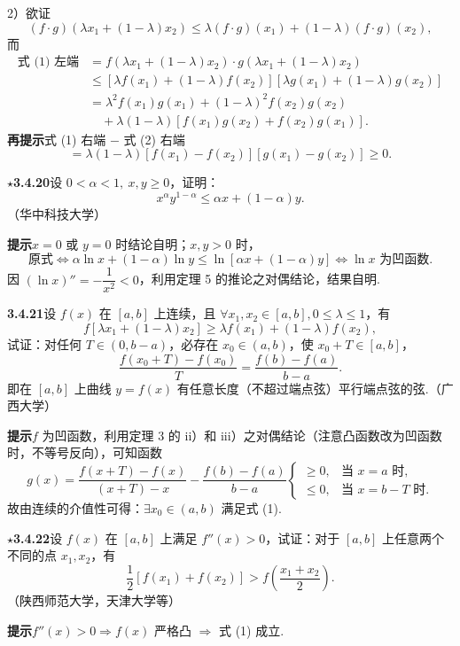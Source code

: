 \documentclass[UTF8,12pt,a4paper,fontset=fandol]{ctexart}
\begin{document}
2）欲证
\[
  (f\cdot g)(\lambda x_1+(1-\lambda)x_2)
  \le \lambda(f\cdot g)(x_1)+(1-\lambda)(f\cdot g)(x_2), \tag{1}
\]
而
\[
\begin{aligned}
\text{式 (1) 左端}
&=f(\lambda x_1+(1-\lambda)x_2)\cdot g(\lambda x_1+(1-\lambda)x_2)\\
&\le[\lambda f(x_1)+(1-\lambda)f(x_2)]
  [\lambda g(x_1)+(1-\lambda)g(x_2)]\\
&=\lambda^2f(x_1)g(x_1)+(1-\lambda)^2f(x_2)g(x_2)\\
&\quad+\lambda(1-\lambda)[f(x_1)g(x_2)+f(x_2)g(x_1)].
\end{aligned}\tag{2}
\]
\noindent\textbf{再提示}\quad 式 (1) 右端 $-$ 式 (2) 右端
\[
  =\lambda(1-\lambda)[f(x_1)-f(x_2)][g(x_1)-g(x_2)]\ge0.
\]

\noindent\textbf{$\star$3.4.20}\quad 设 $0<\alpha<1,\ x,y\ge0$，证明：
\[
  x^\alpha y^{1-\alpha}\le \alpha x+(1-\alpha)y.
\]
（华中科技大学）

\noindent\textbf{提示}\quad $x=0$ 或 $y=0$ 时结论自明；$x,y>0$ 时，
\[
  \text{原式}\Leftrightarrow \alpha\ln x+(1-\alpha)\ln y\le\ln[\alpha x+(1-\alpha)y]\Leftrightarrow \ln x\text{ 为凹函数}.
\]
因 $(\ln x)''=-\dfrac1{x^2}<0$，利用定理 5 的推论之对偶结论，结果自明.

\noindent\textbf{3.4.21}\quad 设 $f(x)$ 在 $[a,b]$ 上连续，且 $\forall x_1,x_2\in[a,b],0\le\lambda\le1$，有
\[
  f[\lambda x_1+(1-\lambda)x_2]\ge\lambda f(x_1)+(1-\lambda)f(x_2),
\]
试证：对任何 $T\in(0,b-a)$，必存在 $x_0\in(a,b)$，使 $x_0+T\in[a,b]$，
\[
  \frac{f(x_0+T)-f(x_0)}T=\frac{f(b)-f(a)}{b-a}. \tag{1}
\]
即在 $[a,b]$ 上曲线 $y=f(x)$ 有任意长度（不超过端点弦）平行端点弦的弦.（广西大学）

\noindent\textbf{提示}\quad $f$ 为凹函数，利用定理 3 的 ii）和 iii）之对偶结论（注意凸函数改为凹函数时，不等号反向），可知函数
\[
  g(x)=\frac{f(x+T)-f(x)}{(x+T)-x}-\frac{f(b)-f(a)}{b-a}
  \begin{cases}
  \ge0, & \text{当 }x=a\text{ 时},\\
  \le0, & \text{当 }x=b-T\text{ 时}.
  \end{cases}
\]
故由连续的介值性可得：$\exists x_0\in(a,b)$ 满足式 (1).

\noindent\textbf{$\star$3.4.22}\quad 设 $f(x)$ 在 $[a,b]$ 上满足 $f''(x)>0$，试证：对于 $[a,b]$ 上任意两个不同的点 $x_1,x_2$，有
\[
  \frac12[f(x_1)+f(x_2)]>f\left(\frac{x_1+x_2}2\right). \tag{1}
\]
（陕西师范大学，天津大学等）

\noindent\textbf{提示}\quad $f''(x)>0\Rightarrow f(x)$ 严格凸 $\Rightarrow$ 式 (1) 成立.
\end{document}
